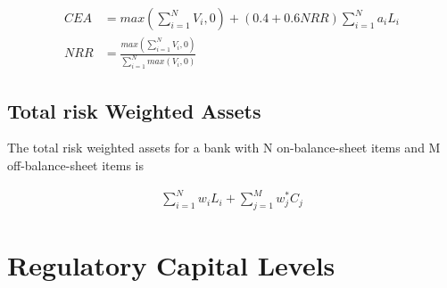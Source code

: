 \documentclass[12pt]{article}
\begin{document}
\begin{align*}
  CEA & = max(\sum_{i=1}^{N} V_{i}, 0) + (0.4 + 0.6 NRR) \sum_{i=1}^{N} a_{i} L_{i} \\
  NRR & = \frac{ max(\sum_{i=1}^{N} V_{i}, 0) }{  \sum_{i=1}^{N} max(V_{i}, 0) }
\end{align*}

\subsection{Total risk Weighted Assets}

The total risk weighted assets for a bank with N on-balance-sheet items and M off-balance-sheet items is

\begin{align*}
  \sum_{i=1}^{N} w_{i} L_{i} + \sum_{j=1}^{M} w_{j}^{*} C_{j}
\end{align*}

\section{Regulatory Capital Levels}
\end{document}
